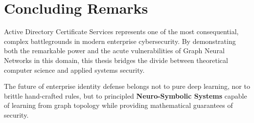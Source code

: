 \section{Concluding Remarks}
Active Directory Certificate Services represents one of the most consequential, complex battlegrounds in modern enterprise cybersecurity. By demonstrating both the remarkable power and the acute vulnerabilities of Graph Neural Networks in this domain, this thesis bridges the divide between theoretical computer science and applied systems security. 

The future of enterprise identity defense belongs not to pure deep learning, nor to brittle hand-crafted rules, but to principled \textbf{Neuro-Symbolic Systems} capable of learning from graph topology while providing mathematical guarantees of security.
